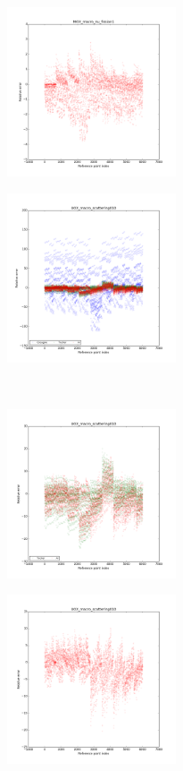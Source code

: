 \begin{center}
\begin{figure}[!h]
		\begin{subfigure}[b]{0.45\textwidth}
				\includegraphics[width=\linewidth,height=5cm]{images/MOX/MOX_macro_nu_fission1_alone.png}
		\end{subfigure}
\end{figure}
\begin{figure}[!h]\ContinuedFloat
		\centering
		\begin{subfigure}[b]{0.45\textwidth}
				\includegraphics[width=\linewidth,height=5cm]{images/UOX/UOX_macro_scattering010_with_cocagne.png}
		\end{subfigure}
		~
		\begin{subfigure}[b]{0.45\textwidth}
				\includegraphics[width=\linewidth,height=5cm]{images/UOX/UOX_macro_scattering010.png}
		\end{subfigure}
		\begin{subfigure}[b]{0.45\textwidth}
				\includegraphics[width=\linewidth,height=5cm]{images/UOX/UOX_macro_scattering010_alone.png}

\end{subfigure}
\end{figure}
\end{center}
